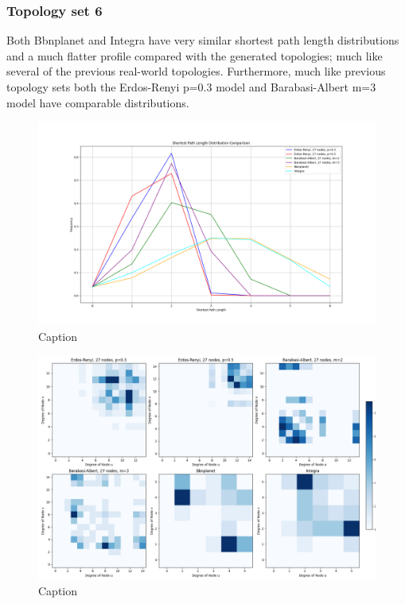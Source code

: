 \subsubsection{Topology set 6}
Both Bbnplanet and Integra have very similar shortest path length distributions and a much flatter profile compared with the generated topologies; much like several of the previous real-world topologies. Furthermore, much like previous topology sets both the Erdos-Renyi p=0.3 model and Barabasi-Albert m=3 model have comparable distributions. 
\begin{figure}
    \centering
    \includegraphics[width=0.9\linewidth]{images/FINAL-TOPO-COMP/line-27.png}
    \caption{Caption}
    \label{fig:enter-label}
\end{figure}

\begin{figure}
    \centering
    \includegraphics[width=0.9\linewidth]{images/FINAL-TOPO-COMP/Degree-correlation-matrices/27-matrix.png}
    \caption{Caption}
    \label{fig:enter-label}
\end{figure}

